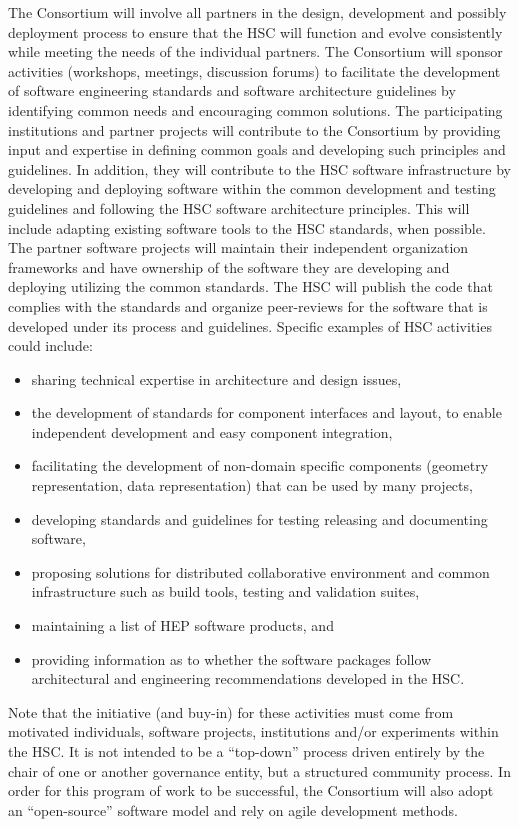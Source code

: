 \documentclass[12pt,letterpaper,fleqn]{article}
\begin{document}
The Consortium will involve all partners in the design, development
and possibly deployment process to ensure that the HSC will function
and evolve consistently while meeting the needs of the individual
partners.  The Consortium will sponsor activities (workshops,
meetings, discussion forums) to facilitate the development of
software engineering standards and software architecture guidelines
by identifying common needs and encouraging common solutions. The
participating institutions and partner projects will contribute to
the Consortium by providing input and expertise in defining common
goals and developing such principles and guidelines.  In addition,
they will contribute to the HSC software infrastructure by developing
and deploying software within the common development and testing
guidelines and following the HSC software architecture principles.
This will include adapting existing software tools to the HSC
standards, when possible.  The partner software projects will
maintain their
independent organization frameworks and have ownership of the
software they are developing and deploying utilizing the common
standards.  The HSC will publish the code that complies with the
standards and organize peer-reviews for the software that is developed
under its process and guidelines.  Specific examples of HSC activities
could include:
\begin{itemize}
\item sharing technical expertise in architecture and design issues,
\item the development of standards for component interfaces and layout, to
enable independent development and easy component integration,
\item facilitating the development of non-domain specific components
(geometry representation, data representation) that can be used
by many projects,
\item developing standards and guidelines for testing releasing and
documenting software,
\item proposing solutions for distributed collaborative environment
and common infrastructure such as build tools, testing and validation
suites,
\item maintaining a list of HEP software products, and
\item providing information as to whether the software packages follow
architectural and engineering recommendations developed in the HSC.
\end{itemize}

Note that the initiative (and buy-in) for these activities
must come from motivated
individuals, software projects, institutions and/or experiments within
the HSC. It is not intended to be a ``top-down'' process driven
entirely by the chair of one or another governance entity, but
a structured community process. In order for this program of work
to be successful, the Consortium will also adopt an ``open-source''
software model and rely on agile development methods.  
\end{document}

